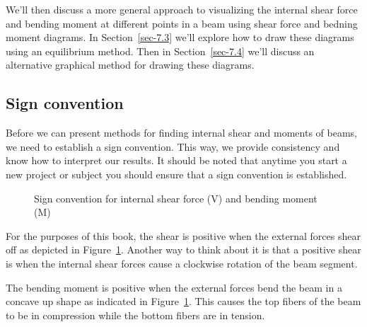 \documentclass[
  letterpaper,
  DIV=11,
  numbers=noendperiod]{scrreprt}
\theoremstyle{definition}
\theoremstyle{remark}
\begin{document}
We'll then discuss a more general approach to visualizing the internal
shear force and bending moment at different points in a beam using shear
force and bedning moment diagrams. In Section~\ref{sec-7.3} we'll
explore how to draw these diagrams using an equilibrium method. Then in
Section~\ref{sec-7.4} we'll discuss an alternative graphical method for
drawing these diagrams.

\subsection*{Sign convention}\label{sign-convention}

Before we can present methods for finding internal shear and moments of
beams, we need to establish a sign convention. This way, we provide
consistency and know how to interpret our results. It should be noted
that anytime you start a new project or subject you should ensure that a
sign convention is established.

\begin{figure}


\caption{\label{fig-7.2}Sign convention for internal shear force (V) and
bending moment (M)}

\end{figure}%

For the purposes of this book, the shear is positive when the external
forces shear off as depicted in Figure~\ref{fig-7.2}. Another way to
think about it is that a positive shear is when the internal shear
forces cause a clockwise rotation of the beam segment.

The bending moment is positive when the external forces bend the beam in
a concave up shape as indicated in Figure~\ref{fig-7.2}. This causes the
top fibers of the beam to be in compression while the bottom fibers are
in tension.
\end{document}

